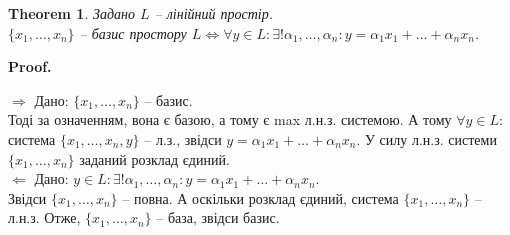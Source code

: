 \documentclass[a4paper, 10pt]{article}
\makeatletter
\def\rightproof{$\boxed{\Rightarrow}$ }
\def\leftproof{$\boxed{\Leftarrow}$ }
\theoremstyle{theoremdd}
\newtheorem{theorem}{Theorem}[subsection]
\renewenvironment{proof}[1][Proof.\\]{\par
\pushQED{\hfill \qed}%
\normalfont \topsep6\p@\@plus6\p@\relax
\trivlist
\item\relax
{\bfseries
#1\@addpunct{.}}\hspace\labelsep\ignorespaces
}{%
\popQED\endtrivlist\@endpefalse
}
\makeatother
\begin{document}
	\iffalse
	\begin{theorem}
	Задано $L$ -- лінійний простір та систему $\{x_1, \dots, x_n\} \subset L$. Наступні властивості еквівалентні:\\
	$1) \{x_1, \dots, x_n\}$ -- max л.н.з.\\
	$2) \{x_1, \dots, x_n\}$ -- повна л.н.з.\\
	$3) \forall y \in L: \exists! \alpha_1, \dots, \alpha_n: y = \alpha_1 x_1 + \dots + \alpha_n x_n$.\\
	\textit{Один з трьох варіантів дозволяє довести існування базису.}
	\end{theorem}
	
	\begin{proof}
	$\boxed{1) \Leftrightarrow 2)}$ вже було.
	\bigskip \\
	$\boxed{2) \Rightarrow 3)}$ Дано: $\{x_1, \dots, x_n\}$ -- повна л.н.з.\\
	$\forall y \in L: \exists \alpha_1, \dots, \alpha_n: y = \alpha_1 x_1 + \dots + \alpha_n x_n$.\\
	Із властивості систем л.н.з. елементів, отримаємо, що розклад є єдиним.
	\bigskip \\
	$\boxed{2) \Leftarrow 3)}$ Дано: $\forall y \in L: \exists! \alpha_1, \dots, \alpha_n: y = \alpha_1 x_1 + \dots + \alpha_n x_n$\\
	Тоді $\{x_1, \dots, x_n\}$ -- повна і, за властивістю, л.н.з.
	\end{proof}
	\fi
	
	\begin{theorem}
	\label{basis_iff_uniquely_decomposed_as_combination}
	Задано $L$ -- лінійний простір.\\
	$\{x_1,\dots,x_n\}$ -- базис простору $L \iff \forall y \in L: \exists! \alpha_1, \dots, \alpha_n: y = \alpha_1 x_1 + \dots + \alpha_n x_n$. 
	\end{theorem}
	
	\begin{proof}
	\rightproof Дано: $\{x_1,\dots,x_n\}$ -- базис.\\
	Тоді за означенням, вона є базою, а тому є max л.н.з. системою. А тому $\forall y \in L:$ система $\{x_1,\dots,x_n,y\}$ -- л.з., звідси $y = \alpha_1x_1+\dots+\alpha_n x_n$. У силу л.н.з. системи $\{x_1,\dots,x_n\}$ заданий розклад єдиний.
	\bigskip \\
	\leftproof Дано: $y \in L: \exists! \alpha_1, \dots, \alpha_n: y = \alpha_1 x_1 + \dots + \alpha_n x_n$.\\
	Звідси $\{x_1,\dots,x_n\}$ -- повна. А оскільки розклад єдиний, система $\{x_1,\dots,x_n\}$ -- л.н.з. Отже, $\{x_1,\dots,x_n\}$ -- база, звідси базис.
	\end{proof}
	
\end{document}
